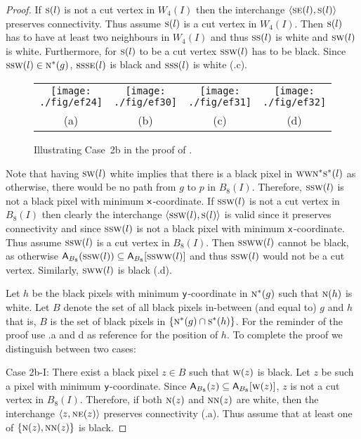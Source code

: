 \documentclass[lotsofwhite,charterfonts]{patmorin}
\newcommand{\N}{\textsc{n}}
\newcommand{\NE}{\textsc{ne}}
\newcommand{\SE}{\textsc{se}}
\renewcommand{\S}{\textsc{s}}
\newcommand{\SW}{\textsc{sw}}
\newcommand{\W}{\textsc{w}}
\newcommand{\x}{\ensuremath{\protect\textup{\textsf{x}}}}
\newcommand{\y}{\ensuremath{\protect\textup{\textsf{y}}}}
\newcommand{\ic}[2]{\langle #1,#2 \rangle}
\newcommand{\A}[2]{\ensuremath{\protect\textup{\textsf{A}}_{#2}(#1)}}
\newcommand{\AC}[2]{\ensuremath{\protect\textup{\textsf{A}}_{#2}[#1]}}
\newcommand{\se}{\ensuremath{\subseteq}}
\begin{document}
\begin{proof}
If $\S(l)$ is not a cut vertex in $W_4(I)$ then the interchange $\ic{\SE(l)}{\S(l)}$ preserves connectivity. Thus assume $\S(l)$ is a cut vertex in $W_4(I)$. Then $\S(l)$ has to have at least two neighbours in $W_4(I)$ and thus $\S\S(l)$ is white and $\SW(l)$ is white.  Furthermore, for $\S(l)$ to be a cut vertex $\S\SW(l)$ has to be black. Since $\S\SW(l)\in \N^*(g)$, $\S\S\SE(l)$ is black and $\S\S\S(l)$ is white (.c).
 
\begin{figure}[htbp]
\begin{center}
\begin{tabular}{cccc}
\texttt{[image: ./fig/ef24]} &
\texttt{[image: ./fig/ef30]} &
\texttt{[image: ./fig/ef31]} & 
\texttt{[image: ./fig/ef32]}\\
(a) & (b) & (c) & (d)
\end{tabular}
\end{center}
\caption{Illustrating Case~2b in the proof of .}
\end{figure}

Note that having $\SW(l)$ white implies that there is a black pixel in $\W\W\N^*\S^*(l)$ as otherwise, there would be no path from $g$ to $p$ in $B_8(I)$. Therefore, $\S\S\W(l)$ is not a black pixel with  minimum \x-coordinate. If $\S\S\W(l)$ is not a cut vertex in $B_8(I)$ then clearly the interchange $\ic{\S\S\W(l)}{\S(l)}$ is valid since it preserves connectivity and  since $\S\S\W(l)$ is not a black pixel with minimum \x-coordinate. Thus assume $\S\S\W(l)$ is a cut vertex in $B_8(I)$. Then $\S\S\W\W(l)$ cannot be black, as otherwise $\A{\S\S\W(l)}{B_8}\se \AC{\S\S\W\W(l)}{B_8}$ and thus $\S\S\W(l)$ would not be a cut vertex. Similarly, $\S\W\W(l)$ is black (.d). 

Let $h$ be the black pixels with minimum \y-coordinate in $\N^*(g)$ such that $\N(h)$ is white. Let $B$ denote the set of all black pixels in-between (and equal to) $g$ and $h$ that is, $B$ is the set of black pixels in $\{\N^*(g)\cap \S^*(h)\}$. For the reminder of the proof use .a and d as reference for the position of $h$. To complete the proof we distinguish between two cases: 


\noindent Case 2b-I: There exist a black pixel $z\in B$ such that $\W(z)$ is black. Let $z$ be such a pixel with minimum \y-coordinate. Since $\A{z}{B_8}\se \AC{\W(z)}{B_8}$, $z$ is not a cut vertex in $B_8(I)$. Therefore, if both  $\N(z)$ and  $\N\N(z)$ are white, then the interchange $\ic{z}{\NE(z)}$ preserves connectivity  (.a). Thus assume that at least one of $\{\N(z),\N\N(z)\}$ is black. 



\end{proof}
\end{document}
